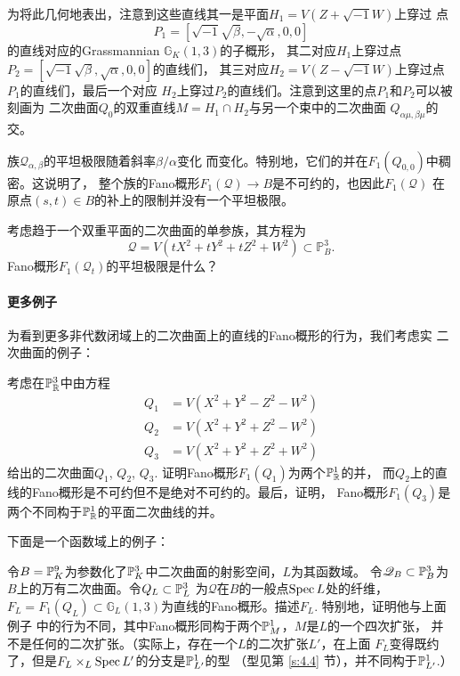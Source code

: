 为将此几何地表出，注意到这些直线其一是平面$H_1=V(Z+\sqrt{-1}W)$上穿过
点
\[
	P_{1}=[\sqrt{-1} \sqrt{\beta},-\sqrt{\alpha}, 0,0]
\]
的直线对应的Grassmannian $\mathbb G_K(1,3)$的子概形，
其二对应$H_1$上穿过点$P_2=[\sqrt{-1}\sqrt\beta,\sqrt\alpha,0,0]$的直线们，
其三对应$H_2=V(Z-\sqrt{-1}W)$上穿过点$P_1$的直线们，最后一个对应
$H_2$上穿过$P_2$的直线们。注意到这里的点$P_1$和$P_2$可以被刻画为
二次曲面$Q_0$的双重直线$M=H_1\cap H_2$与另一个束中的二次曲面
$Q_{\alpha \mu,\beta\mu}$的交。


族$\mathscr Q_{\alpha,\beta}$的平坦极限随着斜率$\beta/\alpha$变化
而变化。特别地，它们的并在$F_1(Q_{0,0})$中稠密。这说明了，
整个族的Fano概形$F_1(\mathscr Q)\to B$是不可约的，也因此$F_1(\mathscr Q)$
在原点$(s,t)\in B$的补上的限制并没有一个平坦极限。

\begin{exe}\label{exe:6.69}
考虑趋于一个双重平面的二次曲面的单参族，其方程为
\[
	\mathscr{Q}=V\left(t X^{2}+t Y^{2}+t Z^{2}+W^{2}\right) \subset \mathbb{P}_{B}^{3}.
\]
Fano概形$F_1(\mathscr Q_t)$的平坦极限是什么？
\end{exe}


\paragraph*{更多例子}
为看到更多非代数闭域上的二次曲面上的直线的Fano概形的行为，我们考虑实
二次曲面的例子：

\begin{exe}\label{exe:4.70}
考虑在$\P_{\mathbb R}^3$中由方程
\[
\begin{aligned} Q_{1} &=V\left(X^{2}+Y^{2}-Z^{2}-W^{2}\right) \\ Q_{2} &=V\left(X^{2}+Y^{2}+Z^{2}-W^{2}\right) \\ Q_{3} &=V\left(X^{2}+Y^{2}+Z^{2}+W^{2}\right) \end{aligned}
\]
给出的二次曲面$Q_1$, $Q_2$, $Q_3$. 证明Fano概形$F_1(Q_1)$为两个$\P_{\mathbb R}^1$的并，
而$Q_2$上的直线的Fano概形是不可约但不是绝对不可约的。最后，证明，
Fano概形$F_1(Q_3)$是两个不同构于$\P_{\mathbb R}^1$的平面二次曲线的并。
\end{exe}

下面是一个函数域上的例子：

\begin{exe}\label{exe:4.71}
令$B=\P_K^9$为参数化了$\P_K^3$中二次曲面的射影空间，$L$为其函数域。
令$\mathscr Q_B\subset \P_B^3$为$B$上的万有二次曲面。令$Q_L\subset \P_L^3$
为$\mathscr Q$在$B$的一般点$\spec L$处的纤维，$F_L=F_1(Q_L)\subset 
\mathbb G_L(1,3)$为直线的Fano概形。描述$F_L$. 特别地，证明他与上面例子
中的行为不同，其中Fano概形同构于两个$\P_M^1$，$M$是$L$的一个四次扩张，
并不是任何的二次扩张。（实际上，存在一个$L$的二次扩张$L'$，在上面
$F_L$变得既约了，但是$F_L\times_L\spec L'$的分支是$\P_{L'}^1$的型
（型见第 \ref{s:4.4} 节），并不同构于$\P_{L'}^1$.）
\end{exe}

